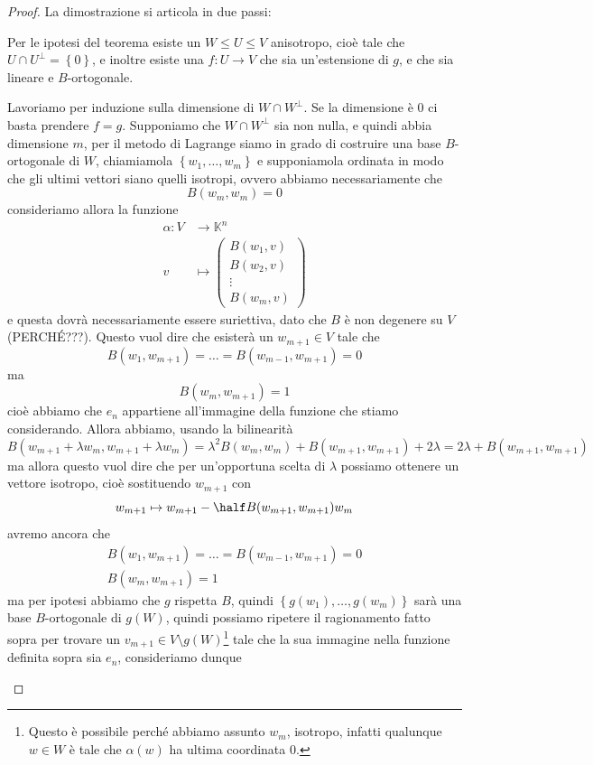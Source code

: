 \documentclass[11pt]{scrartcl}
\newcommand{\KK}{\mathbb{K}}
\begin{document}
	\begin{proof}
		La dimostrazione si articola in due passi:
		\begin{claim}
			Per le ipotesi del teorema esiste un $W\le U \le V$ anisotropo, cioè tale che $U\cap U^\perp=\left\{0\right\}$, e inoltre esiste una $f:U\to V$ che sia un'estensione di $g$, e che sia lineare e $B$-ortogonale.
		\end{claim}
		\begin{subproof}[Sottodimostrazione]
			Lavoriamo per induzione sulla dimensione di $W\cap W^\perp$. Se la dimensione è $0$ ci basta prendere $f=g$. Supponiamo che $W\cap W^\perp$ sia non nulla, e quindi abbia dimensione $m$, per il metodo di Lagrange siamo in grado di costruire una base $B$-ortogonale di $W$, chiamiamola $\left\{w_1,\dots,w_m\right\}$ e supponiamola ordinata in modo che gli ultimi vettori siano quelli isotropi, ovvero abbiamo necessariamente che 
			$$B(w_m,w_m)=0$$
			consideriamo allora la funzione
			\begin{align*}
				\alpha:V & \to \KK^n \\
				v & \mapsto \begin{pmatrix}
					B(w_1,v) \\
					B(w_2,v) \\
					\vdots \\
					B(w_m,v)
				\end{pmatrix}
			\end{align*}
			e questa dovrà necessariamente essere suriettiva, dato che $B$ è non degenere su $V$ (PERCH\'E???). Questo vuol dire che esisterà un $w_{m+1}\in V$ tale che 
			$$B(w_1,w_{m+1})=\dots = B(w_{m-1},w_{m+1})=0$$
			ma 
			$$B(w_m,w_{m+1})=1$$
			cioè abbiamo che $e_n$ appartiene all'immagine della funzione che stiamo considerando. Allora abbiamo, usando la bilinearità 
			$$B(w_{m+1}+\lambda w_m,w_{m+1}+\lambda w_m)=\lambda^2 B(w_m,w_m)+B(w_{m+1},w_{m+1})+2\lambda=2\lambda+B(w_{m+1},w_{m+1})$$
			ma allora questo vuol dire che per un'opportuna scelta di $\lambda$ possiamo ottenere un vettore isotropo, cioè sostituendo $w_{m+1}$ con 
			$$w_{m+1}\mapsto w_{m+1}-\half B(w_{m+1},w_{m+1})w_m$$
			avremo ancora che 
			\begin{gather*}
				B(w_1,w_{m+1})=\dots = B(w_{m-1},w_{m+1})=0 \\
				B(w_m,w_{m+1})=1
			\end{gather*}
			ma per ipotesi abbiamo che $g$ rispetta $B$, quindi $\left\{g(w_1),\dots,g(w_m)\right\}$ sarà una base $B$-ortogonale di $g(W)$, quindi possiamo ripetere il ragionamento fatto sopra per trovare un $v_{m+1}\in V\setminus g(W)$\footnote{Questo è possibile perché abbiamo assunto $w_m$, isotropo, infatti qualunque $w\in W$ è tale che $\alpha(w)$ ha ultima coordinata $0$.} tale che la sua immagine nella funzione definita sopra sia $e_n$, consideriamo dunque 

\end{subproof}
\end{proof}
\end{document}
